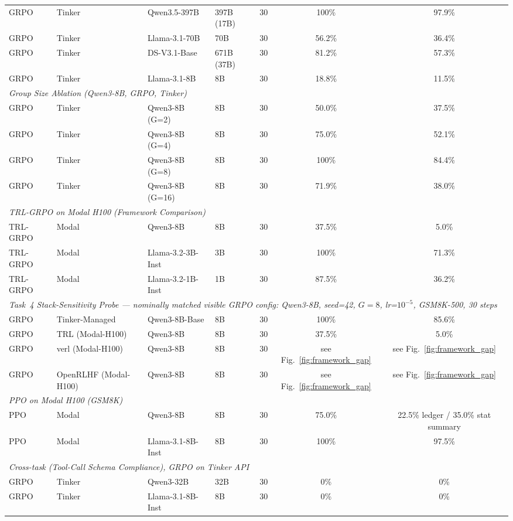 \begin{table}[t]
\begin{tabular}{@{}l l l l r c c@{}}
GRPO & Tinker & Qwen3.5-397B & 397B (17B) & 30 & 100\% & 97.9\% \\
GRPO & Tinker & Llama-3.1-70B & 70B & 30 & 56.2\% & 36.4\% \\
GRPO & Tinker & DS-V3.1-Base & 671B (37B) & 30 & 81.2\% & 57.3\% \\
GRPO & Tinker & Llama-3.1-8B & 8B & 30 & 18.8\% & 11.5\% \\
\midrule
\multicolumn{7}{l}{\textit{Group Size Ablation (Qwen3-8B, GRPO, Tinker)}} \\
\midrule
GRPO & Tinker & Qwen3-8B (G=2) & 8B & 30 & 50.0\% & 37.5\% \\
GRPO & Tinker & Qwen3-8B (G=4) & 8B & 30 & 75.0\% & 52.1\% \\
GRPO & Tinker & Qwen3-8B (G=8) & 8B & 30 & 100\% & 84.4\% \\
GRPO & Tinker & Qwen3-8B (G=16) & 8B & 30 & 71.9\% & 38.0\% \\
\midrule
\multicolumn{7}{l}{\textit{TRL-GRPO on Modal H100 (Framework Comparison)}} \\
\midrule
TRL-GRPO & Modal & Qwen3-8B & 8B & 30 & 37.5\% & 5.0\% \\
TRL-GRPO & Modal & Llama-3.2-3B-Inst & 3B & 30 & 100\% & 71.3\% \\
TRL-GRPO & Modal & Llama-3.2-1B-Inst & 1B & 30 & 87.5\% & 36.2\% \\
\midrule
\multicolumn{7}{l}{\textit{Task~4 Stack-Sensitivity Probe --- nominally matched visible GRPO config: Qwen3-8B, seed=42, $G=8$, lr=$10^{-5}$, GSM8K-500, 30 steps}} \\
\midrule
GRPO & Tinker-Managed & Qwen3-8B-Base & 8B & 30 & 100\% & 85.6\% \\
GRPO & TRL (Modal-H100) & Qwen3-8B & 8B & 30 & 37.5\% & 5.0\% \\
GRPO & verl (Modal-H100) & Qwen3-8B & 8B & 30 & see Fig.~\ref{fig:framework_gap} & see Fig.~\ref{fig:framework_gap} \\
GRPO & OpenRLHF (Modal-H100) & Qwen3-8B & 8B & 30 & see Fig.~\ref{fig:framework_gap} & see Fig.~\ref{fig:framework_gap} \\
\midrule
\multicolumn{7}{l}{\textit{PPO on Modal H100 (GSM8K)}} \\
\midrule
PPO & Modal & Qwen3-8B & 8B & 30 & 75.0\% & 22.5\% ledger / 35.0\% stat summary \\
PPO & Modal & Llama-3.1-8B-Inst & 8B & 30 & 100\% & 97.5\% \\
\midrule
\multicolumn{7}{l}{\textit{Cross-task (Tool-Call Schema Compliance), GRPO on Tinker API}} \\
\midrule
GRPO & Tinker & Qwen3-32B & 32B & 30 & 0\% & 0\% \\
GRPO & Tinker & Llama-3.1-8B-Inst & 8B & 30 & 0\% & 0\% \\
\bottomrule
\end{tabular}
\end{table}

